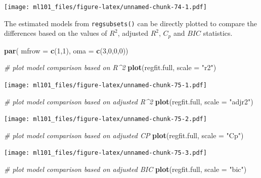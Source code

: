 \documentclass[]{article}
\newenvironment{Shaded}{\begin{snugshade}}{\end{snugshade}}
\newcommand{\CommentTok}[1]{\textcolor[rgb]{0.56,0.35,0.01}{\textit{#1}}}
\newcommand{\DataTypeTok}[1]{\textcolor[rgb]{0.13,0.29,0.53}{#1}}
\newcommand{\DecValTok}[1]{\textcolor[rgb]{0.00,0.00,0.81}{#1}}
\newcommand{\KeywordTok}[1]{\textcolor[rgb]{0.13,0.29,0.53}{\textbf{#1}}}
\newcommand{\NormalTok}[1]{#1}
\newcommand{\StringTok}[1]{\textcolor[rgb]{0.31,0.60,0.02}{#1}}
\begin{document}
\texttt{[image: ml101\_files/figure-latex/unnamed-chunk-74-1.pdf]}

The estimated models from \texttt{regsubsets()} can be directly plotted to compare the differences based on the values of \(R^2\), adjusted \(R^2\), \(C_{p}\) and \(BIC\) statistics.

\begin{Shaded}
\begin{Highlighting}[]
\KeywordTok{par}\NormalTok{( }\DataTypeTok{mfrow =} \KeywordTok{c}\NormalTok{(}\DecValTok{1}\NormalTok{,}\DecValTok{1}\NormalTok{), }\DataTypeTok{oma =} \KeywordTok{c}\NormalTok{(}\DecValTok{3}\NormalTok{,}\DecValTok{0}\NormalTok{,}\DecValTok{0}\NormalTok{,}\DecValTok{0}\NormalTok{))}

\CommentTok{# plot model comparison based on R^2}
\KeywordTok{plot}\NormalTok{(regfit.full, }\DataTypeTok{scale =} \StringTok{"r2"}\NormalTok{)}
\end{Highlighting}
\end{Shaded}

\texttt{[image: ml101\_files/figure-latex/unnamed-chunk-75-1.pdf]}

\begin{Shaded}
\begin{Highlighting}[]
\CommentTok{# plot model comparison based on adjusted R^2}
\KeywordTok{plot}\NormalTok{(regfit.full, }\DataTypeTok{scale =} \StringTok{"adjr2"}\NormalTok{)}
\end{Highlighting}
\end{Shaded}

\texttt{[image: ml101\_files/figure-latex/unnamed-chunk-75-2.pdf]}

\begin{Shaded}
\begin{Highlighting}[]
\CommentTok{# plot model comparison based on adjusted CP}
\KeywordTok{plot}\NormalTok{(regfit.full, }\DataTypeTok{scale =} \StringTok{"Cp"}\NormalTok{)}
\end{Highlighting}
\end{Shaded}

\texttt{[image: ml101\_files/figure-latex/unnamed-chunk-75-3.pdf]}

\begin{Shaded}
\begin{Highlighting}[]
\CommentTok{# plot model comparison based on adjusted BIC}
\KeywordTok{plot}\NormalTok{(regfit.full, }\DataTypeTok{scale =} \StringTok{"bic"}\NormalTok{)}
\end{Highlighting}
\end{Shaded}
\end{document}
